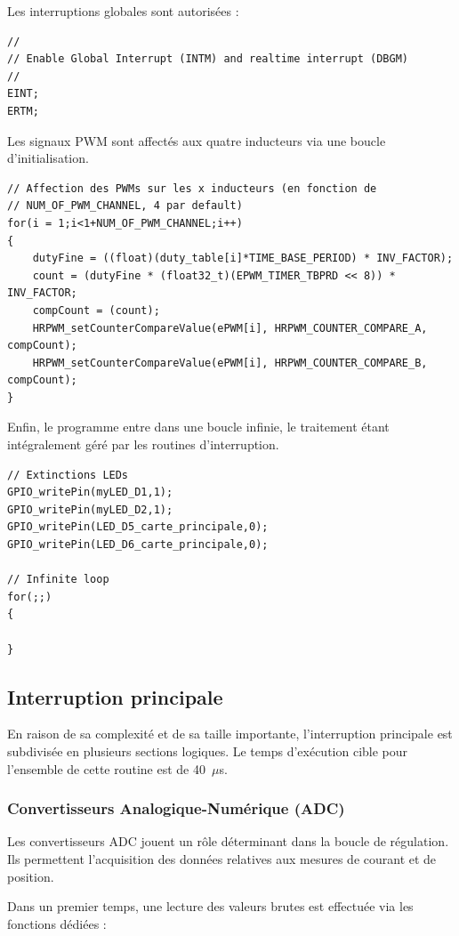 Les interruptions globales sont autorisées :

\begin{verbatim}
//
// Enable Global Interrupt (INTM) and realtime interrupt (DBGM)
//
EINT;
ERTM;
\end{verbatim}

Les signaux PWM sont affectés aux quatre inducteurs via une boucle d'initialisation.

\begin{verbatim}
// Affection des PWMs sur les x inducteurs (en fonction de
// NUM_OF_PWM_CHANNEL, 4 par default)
for(i = 1;i<1+NUM_OF_PWM_CHANNEL;i++)
{
    dutyFine = ((float)(duty_table[i]*TIME_BASE_PERIOD) * INV_FACTOR);
    count = (dutyFine * (float32_t)(EPWM_TIMER_TBPRD << 8)) * INV_FACTOR;
    compCount = (count);
    HRPWM_setCounterCompareValue(ePWM[i], HRPWM_COUNTER_COMPARE_A, compCount);
    HRPWM_setCounterCompareValue(ePWM[i], HRPWM_COUNTER_COMPARE_B, compCount);
}
\end{verbatim}

Enfin, le programme entre dans une boucle infinie, le traitement étant intégralement géré par les routines d'interruption.

\begin{verbatim}
// Extinctions LEDs
GPIO_writePin(myLED_D1,1);
GPIO_writePin(myLED_D2,1);
GPIO_writePin(LED_D5_carte_principale,0);
GPIO_writePin(LED_D6_carte_principale,0);

// Infinite loop
for(;;)
{

}
\end{verbatim}

\subsection{Interruption principale}
En raison de sa complexité et de sa taille importante, l'interruption principale est subdivisée en plusieurs sections logiques. Le temps d'exécution cible pour l'ensemble de cette routine est de 40~$\mu$s.

\subsubsection{Convertisseurs Analogique-Numérique (ADC)}
\label{subsubsec:ADC}

Les convertisseurs ADC jouent un rôle déterminant dans la boucle de régulation. Ils permettent l'acquisition des données relatives aux mesures de courant et de position.

Dans un premier temps, une lecture des valeurs brutes est effectuée via les fonctions dédiées :

